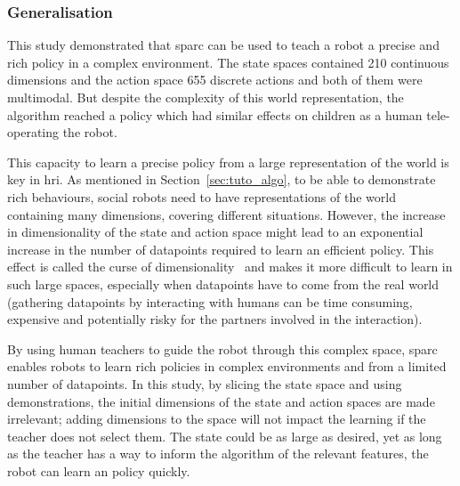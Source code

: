 \subsubsection{Generalisation}

This study demonstrated that \gls{sparc} can be used to teach a robot a precise and rich policy in a complex environment. The state spaces contained 210 continuous dimensions and the action space 655 discrete actions and both of them were multimodal. But despite the complexity of this world representation, the algorithm reached a policy which had similar effects on children as a human tele-operating the robot. 

This capacity to learn a precise policy from a large representation of the world is key in \gls{hri}. As mentioned in Section~\ref{sec:tuto_algo}, to be able to demonstrate rich behaviours, social robots need to have representations of the world containing many dimensions, covering different situations. However, the increase in dimensionality of the state and action space might lead to an exponential increase in the number of datapoints required to learn an efficient policy. This effect is called the curse of dimensionality~\citep{bellman1957dynamic} and makes it more difficult to learn in such large spaces, especially when datapoints have to come from the real world (gathering datapoints by interacting with humans can be time consuming, expensive and potentially risky for the partners involved in the interaction).

By using human teachers to guide the robot through this complex space, \gls{sparc} enables robots to learn rich policies in complex environments and from a limited number of datapoints. In this study, by slicing the state space and using demonstrations, the initial dimensions of the state and action spaces are made irrelevant; adding dimensions to the space will not impact the learning if the teacher does not select them. The state could be as large as desired, yet as long as the teacher has a way to inform the algorithm of the relevant features, the robot can learn an policy quickly. 


